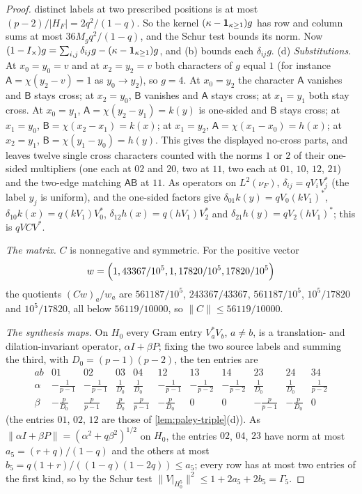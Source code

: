 \begin{proof}
distinct labels at two prescribed positions is at most $(p-2)/|H_F|=2q^2/(1-q)$.
So the kernel $(\kappa-\one_{\kappa\ge1})g$ has row and column sums at most
$36M_gq^2/(1-q)$, and the Schur test bounds its norm. Now
$(1-I_\times)g=\sum_{i,j}\delta_{ij}g-(\kappa-\one_{\kappa\ge1})g$, and (b) bounds
each $\delta_{ij}g$.
(d) \emph{Substitutions.} At $x_0=y_0=v$ and at $x_2=y_2=v$ both characters of
$g$ equal $1$ (for instance $\mathsf A=\chi(y_2-v)=1$ as $y_0\to y_2$), so $g=4$.
At $x_0=y_2$ the character $\mathsf A$ vanishes and $\mathsf B$ stays cross; at
$x_2=y_0$, $\mathsf B$ vanishes and $\mathsf A$ stays cross; at $x_1=y_1$ both stay
cross. At $x_0=y_1$, $\mathsf A=\chi(y_2-y_1)=k(y)$ is one-sided and $\mathsf B$
stays cross; at $x_1=y_0$, $\mathsf B=\chi(x_2-x_1)=k(x)$; at $x_1=y_2$,
$\mathsf A=\chi(x_1-x_0)=h(x)$; at $x_2=y_1$, $\mathsf B=\chi(y_1-y_0)=h(y)$. This
gives the displayed no-cross parts, and leaves twelve single cross characters
counted with the norms $1$ or $2$ of their one-sided multipliers (one each at
$02$ and $20$, two at $11$, two each at $01$, $10$, $12$, $21$) and the two-edge
matching $\mathsf A\mathsf B$ at $11$. As operators on $L^2(\nu_F)$,
$\delta_{ij}=qV_iV_j^*$ (the label $y_j$ is uniform), and the one-sided factors
give $\delta_{01}k(y)=qV_0(kV_1)^*$, $\delta_{10}k(x)=q(kV_1)V_0^*$,
$\delta_{12}h(x)=q(hV_1)V_2^*$ and $\delta_{21}h(y)=qV_2(hV_1)^*$; this is $qVCV^*$.

\emph{The matrix.} $C$ is nonnegative and symmetric. For the positive vector
\[
 w=\Bigl(1,\frac{43367}{10^5},1,\frac{17820}{10^5},\frac{17820}{10^5}\Bigr)
\]
the quotients $(Cw)_a/w_a$ are $561187/10^5$, $243367/43367$, $561187/10^5$,
$10^5/17820$ and $10^5/17820$, all below $56119/10000$, so
$\|C\|\le56119/10000$.

\emph{The synthesis maps.} On $H_0$ every Gram entry $V_a^*V_b$,
$a\ne b$, is a
translation- and dilation-invariant operator, $\alpha I+\beta P$; fixing the two
source labels and summing the third, with $D_0=(p-1)(p-2)$, the ten entries are
\[
\begin{array}{c|cccccccccc}
 ab&01&02&03&04&12&13&14&23&24&34\\\hline
 \alpha&-\frac1{p-1}&-\frac1{p-1}&\frac1{D_0}&\frac1{D_0}
 &-\frac1{p-1}&-\frac1{p-2}&-\frac1{p-2}&\frac1{D_0}&\frac1{D_0}&\frac1{p-2}\\[2pt]
 \beta&-\frac p{D_0}&\frac p{p-1}&\frac p{D_0}&\frac p{p-1}
 &-\frac p{D_0}&0&0&-\frac p{p-1}&-\frac p{D_0}&0
\end{array}
\]
(the entries $01$, $02$, $12$ are those of \cref{lem:paley-triple}(d)). As
$\|\alpha I+\beta P\|=(\alpha^2+q\beta^2)^{1/2}$ on $H_0$, the entries $02$, $04$,
$23$ have norm at most $a_5=(r+q)/(1-q)$ and the others at most
$b_5=q(1+r)/((1-q)(1-2q))\le a_5$; every row has at most two entries of the
first kind, so by the Schur test $\|V|_{H_0^5}\|^2\le1+2a_5+2b_5=\Gamma_5$.


\end{proof}
